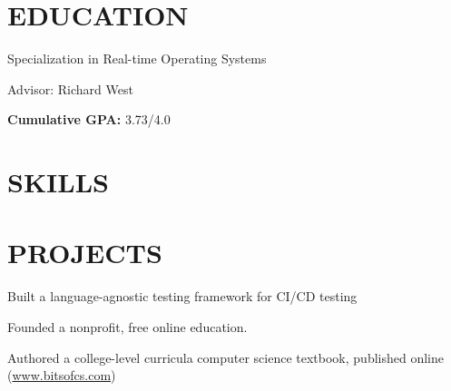 \documentclass[10pt]{article} 
\begin{document}
\begin{FlushLeft}

  \section{EDUCATION}
  \begin{itemize}{
    \item Specialization in Real-time Operating Systems
    \item Advisor: Richard West}            
  \end{itemize}
  \begin{itemize}{
    \item \textbf{Cumulative GPA:} 3.73/4.0 }
  \end{itemize}
  \resumevspace

  \section{SKILLS}
  \vspace{-0.75em}
  \begin{itemize}{
     }
  \end{itemize}

  \section{PROJECTS}
  \begin{itemize}{
    \item Built a language-agnostic testing framework for CI/CD
      testing }
  \end{itemize}  
  \begin{itemize}{
    \item Founded a nonprofit, free online education.
    \item Authored a college-level curricula computer science
      textbook, published online
      (\href{www.bitsofcs.com}{www.bitsofcs.com}) }
  \end{itemize}
  

\end{FlushLeft}
\end{document}
